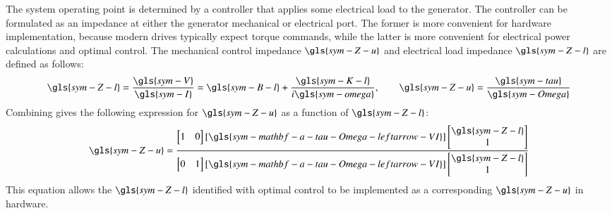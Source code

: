 The system operating point is determined by a controller that applies some electrical load to the generator.
The controller can be formulated as an impedance at either the generator mechanical or electrical port.
The former is more convenient for hardware implementation, because modern drives typically expect torque commands,
while the latter is more convenient for electrical power calculations and optimal control.
The mechanical control impedance $\gls{sym-Z-u}$ and electrical load impedance $\gls{sym-Z-l}$ are defined as follows:
\begin{equation}\label{eq:controller-impedances}
    \gls{sym-Z-l} = \frac{\gls{sym-V}}{\gls{sym-I}} = \gls{sym-B-l} + \frac{\gls{sym-K-l}}{i\gls{sym-omega}}
    ,  \qquad
    \gls{sym-Z-u} = \frac{\gls{sym-tau}}{\gls{sym-Omega}}%
\end{equation}
Combining  gives the following expression for $\gls{sym-Z-u}$ as a function of $\gls{sym-Z-l}$:
\begin{equation}\label{eq:control-impedance}
    \gls{sym-Z-u} =
    \frac{
    \begin{bmatrix}
    1 & 0
    \end{bmatrix}
    [\gls{sym-mathbf-a-tau-Omega-leftarrow-VI}]
    \begin{bmatrix}
    \gls{sym-Z-l} \\ 1
    \end{bmatrix}
}{
    \begin{bmatrix}
    0 & 1
    \end{bmatrix}
    [\gls{sym-mathbf-a-tau-Omega-leftarrow-VI}]
    \begin{bmatrix}
    \gls{sym-Z-l} \\ 1
    \end{bmatrix}
}
\end{equation}
This equation allows the $\gls{sym-Z-l}$ identified with optimal control to be implemented as a corresponding $\gls{sym-Z-u}$ in hardware.

